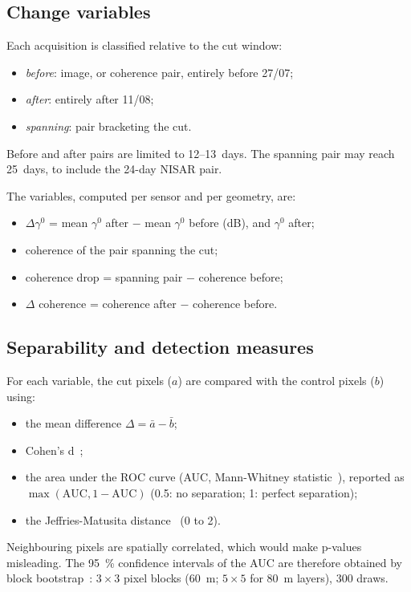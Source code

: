 \documentclass[11pt,a4paper]{article}
\begin{document}
\subsection{Change variables}

Each acquisition is classified relative to the cut window:
\begin{itemize}
\item \emph{before}: image, or coherence pair, entirely before 27/07;
\item \emph{after}: entirely after 11/08;
\item \emph{spanning}: pair bracketing the cut.
\end{itemize}
Before and after pairs are limited to 12--13~days. The spanning pair may reach 25~days, to include the 24-day NISAR
pair.

The variables, computed per sensor and per geometry, are:
\begin{itemize}
\item $\Delta\gamma^0$ = mean $\gamma^0$ after $-$ mean $\gamma^0$ before (dB), and $\gamma^0$ after;
\item coherence of the pair spanning the cut;
\item coherence drop = spanning pair $-$ coherence before;
\item $\Delta$ coherence = coherence after $-$ coherence before.
\end{itemize}

\subsection{Separability and detection measures}

For each variable, the cut pixels ($a$) are compared with the control pixels ($b$) using:
\begin{itemize}
\item the mean difference $\Delta=\bar a-\bar b$;
\item Cohen's d~\cite{cohen1988power};
\item the area under the ROC curve (AUC, Mann-Whitney statistic~\cite{hanley1982auc}), reported as
  $\max(\mathrm{AUC}, 1-\mathrm{AUC})$ (0.5: no separation; 1: perfect separation);
\item the Jeffries-Matusita distance~\cite{swain1978remote} (0 to 2).
\end{itemize}
Neighbouring pixels are spatially correlated, which would make p-values misleading. The 95~\% confidence intervals
of the AUC are therefore obtained by block bootstrap~\cite{kunsch1989bootstrap}: $3\times3$ pixel blocks (60~m;
$5\times5$ for 80~m layers), 300 draws.
\end{document}
